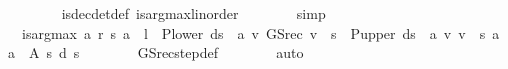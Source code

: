 \begin{isabellebody}
\ \ \ \ \ \ \isamarkupfalse%
\ is{\isacharunderscore}{\kern0pt}dec{\isacharunderscore}{\kern0pt}det{\isacharunderscore}{\kern0pt}def\ is{\isacharunderscore}{\kern0pt}arg{\isacharunderscore}{\kern0pt}max{\isacharunderscore}{\kern0pt}linorder\isanewline
\ \ \ \ \ \ \isamarkupfalse%
\ simp\isanewline
\ \ \ \ \isamarkupfalse%
\ {\isacharasterisk}{\kern0pt}{\isacharcolon}{\kern0pt}\ {\isachardoublequoteopen}is{\isacharunderscore}{\kern0pt}arg{\isacharunderscore}{\kern0pt}max\ {\isacharparenleft}{\kern0pt}{\isasymlambda}a{\isachardot}{\kern0pt}\ r\ {\isacharparenleft}{\kern0pt}s{\isacharcomma}{\kern0pt}\ a{\isacharparenright}{\kern0pt}\ {\isacharplus}{\kern0pt}\ l\ {\isacharasterisk}{\kern0pt}\ {\isacharparenleft}{\kern0pt}{\isacharparenleft}{\kern0pt}P{\isacharunderscore}{\kern0pt}lower\ {\isacharparenleft}{\kern0pt}d{\isacharparenleft}{\kern0pt}s\ {\isacharcolon}{\kern0pt}{\isacharequal}{\kern0pt}\ a{\isacharparenright}{\kern0pt}{\isacharparenright}{\kern0pt}\ {\isacharasterisk}{\kern0pt}v\ GS{\isacharunderscore}{\kern0pt}rec\ v{\isacharparenright}{\kern0pt}\ {\isachardollar}{\kern0pt}\ s\ {\isacharplus}{\kern0pt}\ {\isacharparenleft}{\kern0pt}P{\isacharunderscore}{\kern0pt}upper\ {\isacharparenleft}{\kern0pt}d{\isacharparenleft}{\kern0pt}s\ {\isacharcolon}{\kern0pt}{\isacharequal}{\kern0pt}\ a{\isacharparenright}{\kern0pt}{\isacharparenright}{\kern0pt}\ {\isacharasterisk}{\kern0pt}v\ v{\isacharparenright}{\kern0pt}\ {\isachardollar}{\kern0pt}\ s{\isacharparenright}{\kern0pt}{\isacharparenright}{\kern0pt}\ {\isacharparenleft}{\kern0pt}{\isasymlambda}a{\isachardot}{\kern0pt}\ a\ {\isasymin}\ A\ s{\isacharparenright}{\kern0pt}\ {\isacharparenleft}{\kern0pt}d\ s{\isacharparenright}{\kern0pt}{\isachardoublequoteclose}\isanewline
\ \ \ \ \ \ \isamarkupfalse%
\ GS{\isacharunderscore}{\kern0pt}rec{\isacharunderscore}{\kern0pt}step{\isacharunderscore}{\kern0pt}def\isanewline
\ \ \ \ \ \ \isamarkupfalse%
\ auto\isanewline
\ \ \ \ \isamarkupfalse%

\end{isabellebody}
